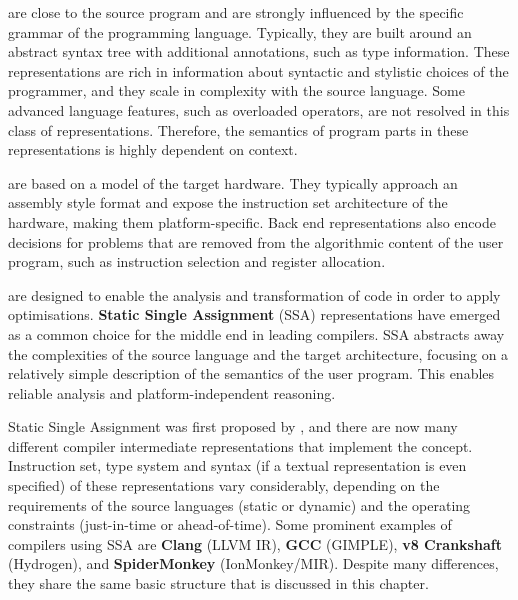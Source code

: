     \begin{description}[style=unboxed,leftmargin=0cm,labelindent=\parindent]
    \item[Front end representations] are close to the source program and
    are strongly influenced by the specific grammar of the programming language.
    Typically, they are built around an abstract syntax tree with additional
    annotations, such as type information.
    These representations are rich in information about syntactic and stylistic
    choices of the programmer, and they scale in complexity with the source
    language.
    Some advanced language features, such as overloaded operators, are not
    resolved in this class of representations.
    Therefore, the semantics of program parts in these representations
    is highly dependent on context.

    \item[\bf Back end representations] are based on a model of the target
    hardware.
    They typically approach an assembly style format and expose the instruction
    set architecture of the hardware, making them platform-specific.
    Back end representations also encode decisions for problems that are removed
    from the algorithmic content of the user program, such as instruction
    selection and register allocation.

    \item[\bf Middle end representations] are designed to enable the analysis
    and transformation of code in order to apply optimisations.
    {\bf Static Single Assignment} (SSA) representations have emerged as a
    common choice for the middle end in leading compilers.
    SSA abstracts away the complexities of the source language and the
    target architecture, focusing on a relatively simple description of the
    semantics of the user program.
    This enables reliable analysis and platform-independent reasoning.
    \end{description}

    Static Single Assignment was first proposed by
    \citet{Rosen:1988:GVN:73560.73562}, and there are now many different
    compiler intermediate representations that implement the concept.
    Instruction set, type system and syntax
    (if a textual representation is even specified) of these representations
    vary considerably, depending on the requirements of the source languages
    (static or dynamic) and the operating constraints
    (just-in-time or ahead-of-time).
    Some prominent examples of compilers using SSA are
    {\bf Clang} (LLVM IR), {\bf GCC} (GIMPLE), {\bf v8 Crankshaft} (Hydrogen),
    and {\bf SpiderMonkey} (IonMonkey/MIR).
    Despite many differences, they share the same basic structure that is
    discussed in this chapter.

